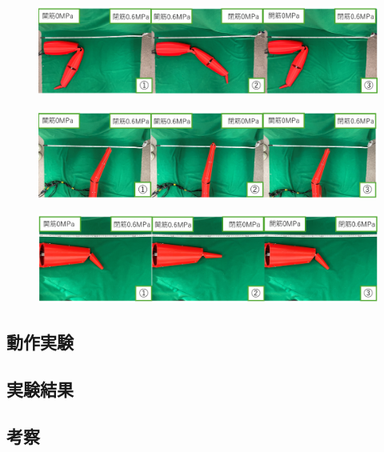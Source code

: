 \begin{figure}[t]
    \begin{minipage}{1\hsize}
      \centering
      \includegraphics[scale=0.45]{image/chousetu-wansetu_edited.png}
      \vspace{-1mm}
      \label{fig:move_1}
    \end{minipage}
    \begin{minipage}{1\hsize}
      \centering
      \vspace{3mm}
      \includegraphics[scale=0.45]{image/wansetu-zensetu_edited.png}
      \label{fig:move_2}
    \end{minipage}
    \begin{minipage}{1\hsize}
      \centering
      \vspace{3mm}
      \includegraphics[scale=0.45]{image/zensetu-sisetu_edited.png}
      \label{fig:mone_3}
    \end{minipage}
\end{figure}
\subsection{動作実験}

\subsection{実験結果}

\subsection{考察}
